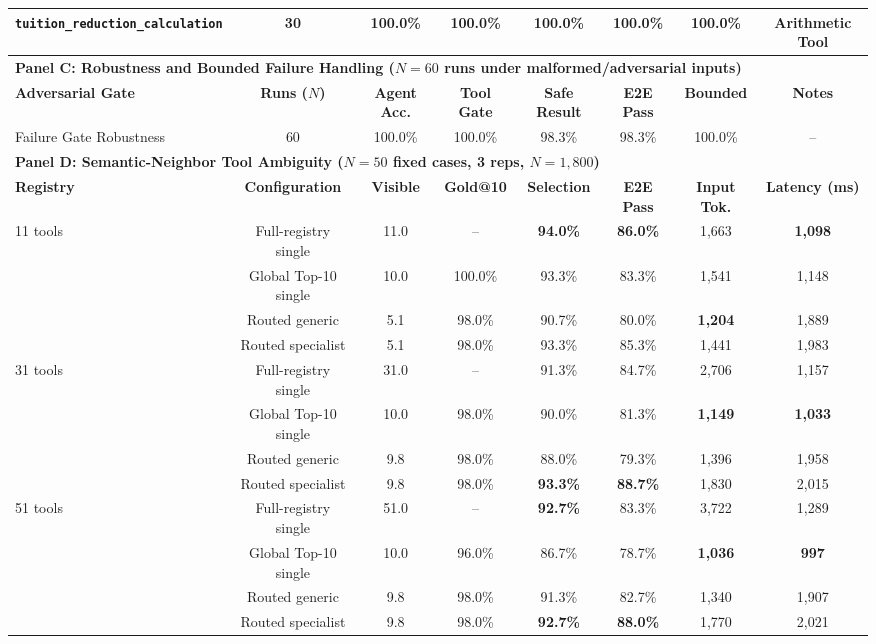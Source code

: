 \begin{table}[!htbp]
{\begin{tabular}{lccccccc}
\texttt{tuition\_reduction\_calculation}& 30 & 100.0\% & 100.0\% & 100.0\% & 100.0\% & 100.0\% & Arithmetic Tool \\
\midrule
\multicolumn{8}{l}{\textbf{Panel C: Robustness and Bounded Failure Handling ($N=60$ runs under malformed/adversarial inputs)}} \\
\midrule
\textbf{Adversarial Gate} & \textbf{Runs ($N$)} & \textbf{Agent Acc.} & \textbf{Tool Gate} & \textbf{Safe Result} & \textbf{E2E Pass} & \textbf{Bounded} & \textbf{Notes} \\
\midrule
Failure Gate Robustness    & 60 & 100.0\% & 100.0\% & 98.3\% & 98.3\% & 100.0\% & -- \\
\midrule
\multicolumn{8}{l}{\textbf{Panel D: Semantic-Neighbor Tool Ambiguity ($N=50$ fixed cases, 3 reps, $N=1,800$)}} \\
\midrule
\textbf{Registry} & \textbf{Configuration} & \textbf{Visible} & \textbf{Gold@10} & \textbf{Selection} & \textbf{E2E Pass} & \textbf{Input Tok.} & \textbf{Latency (ms)} \\
\midrule
\multirow{4}{*}{11 tools} & Full-registry single & 11.0 & -- & \textbf{94.0\%} & \textbf{86.0\%} & 1,663 & \textbf{1,098} \\
 & Global Top-10 single & 10.0 & 100.0\% & 93.3\% & 83.3\% & 1,541 & 1,148 \\
 & Routed generic & 5.1 & 98.0\% & 90.7\% & 80.0\% & \textbf{1,204} & 1,889 \\
 & Routed specialist & 5.1 & 98.0\% & 93.3\% & 85.3\% & 1,441 & 1,983 \\
\midrule
\multirow{4}{*}{31 tools} & Full-registry single & 31.0 & -- & 91.3\% & 84.7\% & 2,706 & 1,157 \\
 & Global Top-10 single & 10.0 & 98.0\% & 90.0\% & 81.3\% & \textbf{1,149} & \textbf{1,033} \\
 & Routed generic & 9.8 & 98.0\% & 88.0\% & 79.3\% & 1,396 & 1,958 \\
 & Routed specialist & 9.8 & 98.0\% & \textbf{93.3\%} & \textbf{88.7\%} & 1,830 & 2,015 \\
\midrule
\multirow{4}{*}{51 tools} & Full-registry single & 51.0 & -- & \textbf{92.7\%} & 83.3\% & 3,722 & 1,289 \\
 & Global Top-10 single & 10.0 & 96.0\% & 86.7\% & 78.7\% & \textbf{1,036} & \textbf{997} \\
 & Routed generic & 9.8 & 98.0\% & 91.3\% & 82.7\% & 1,340 & 1,907 \\
 & Routed specialist & 9.8 & 98.0\% & \textbf{92.7\%} & \textbf{88.0\%} & 1,770 & 2,021 \\

\end{tabular}}
\end{table}
